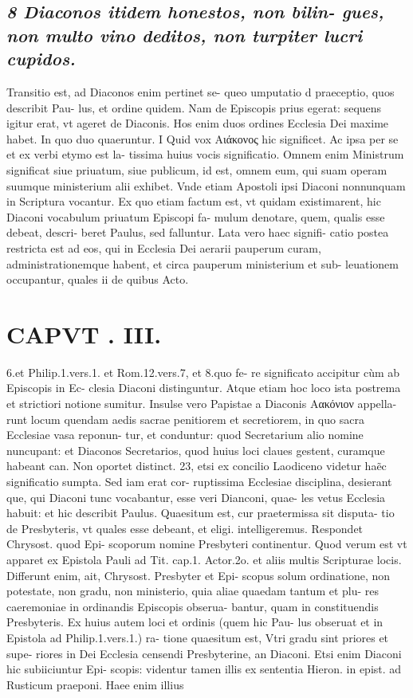 \documentclass{article}
\begin{document}
\begin{pages}
\subsection*{\textit{8 Diaconos itidem honestos, non bilin- gues, non multo vino deditos, non turpiter lucri cupidos. }}\pstart Transitio est, ad Diaconos enim pertinet se- queo umputatio d praeceptio, quos describit Pau- lus, et ordine quidem. Nam de Episcopis prius egerat: sequens igitur erat, vt ageret de Diaconis. Hos enim duos ordines Ecclesia Dei maxime habet.  \pend\pstart In quo duo quaeruntur. I Quid vox Αιάκονος hic significet. Ac ipsa per se et ex verbi etymo est la- tissima huius vocis significatio. Omnem enim Ministrum significat siue priuatum, siue publicum, id est, omnem eum, qui suam operam suumque ministerium alii exhibet. Vnde etiam Apostoli ipsi Diaconi nonnunquam in Scriptura vocantur. Ex quo etiam factum est, vt quidam existimarent, hic Diaconi vocabulum priuatum Episcopi fa- mulum denotare, quem, qualis esse debeat, descri- beret Paulus, sed falluntur. Lata vero haec signifi- catio postea restricta est ad eos, qui in Ecclesia Dei aerarii pauperum curam, administrationemque  habent, et circa pauperum ministerium et sub- leuationem occupantur, quales ii de quibus Acto.  \pend
\section*{CAPVT . III. }
\marginpar{[ p.157 ]}\pstart 6.et Philip.1.vers.1. et Rom.12.vers.7, et 8.quo fe- re significato accipitur cùm ab Episcopis in Ec- clesia Diaconi distinguntur. Atque etiam hoc loco ista postrema et strictiori notione sumitur. Insulse vero Papistae a Diaconis Αακόνιον appella- runt locum quendam aedis sacrae penitiorem et secretiorem, in quo sacra Ecclesiae vasa reponun- tur, et conduntur: quod Secretarium alio nomine nuncupant: et Diaconos Secretarios, quod huius loci claues gestent, curamque habeant can. Non oportet distinct. 23, etsi ex concilio Laodiceno videtur haẽc significatio sumpta. Sed iam erat cor- ruptissima Ecclesiae disciplina, desierant que, qui Diaconi tunc vocabantur, esse veri Dianconi, quae- les vetus Ecclesia habuit: et hic describit Paulus.  \pend{} Quaesitum est, cur praetermissa sit disputa- tio de Presbyteris, vt quales esse debeant, et eligi. intelligeremus. Respondet Chrysost. quod Epi- scoporum nomine Presbyteri continentur. Quod verum est vt apparet ex Epistola Pauli ad Tit. cap.1. Actor.2o. et aliis multis Scripturae locis. Differunt enim, ait, Chrysost. Presbyter et Epi- scopus solum ordinatione, non potestate, non gradu, non ministerio, quia aliae quaedam tantum et plu- res caeremoniae in ordinandis Episcopis obserua- bantur, quam in constituendis Presbyteris.  \pend\pstart Ex huius autem loci et ordinis (quem hic Pau- lus obseruat et in Epistola ad Philip.1.vers.1.) ra- tione quaesitum est, Vtri gradu sint priores et supe- riores in Dei Ecclesia censendi Presbyterine, an Diaconi. Etsi enim Diaconi hic subiiciuntur Epi- scopis: videntur tamen illis ex sententia Hieron. in epist. ad Rusticum praeponi. Haee enim illius  \pend

\end{pages}
\end{document}
